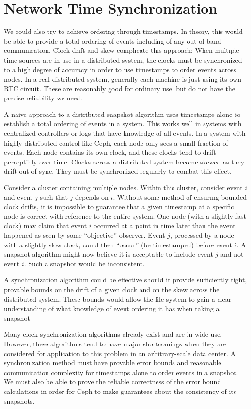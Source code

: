 \section{Network Time Synchronization}

We could also try to achieve ordering through timestamps. In theory,
this would be able to provide a total ordering of events including
of any out-of-band communication. Clock drift and skew complicate this
approach: When multiple time sources are in use in a distributed system,
the clocks must be synchronized to a high degree of accuracy in order
to use timestamps to order events across nodes. In a real distributed
system, generally each machine is just using its own RTC
circuit. These are reasonably good for ordinary use, but do not have
the precise reliability we need. %

A naive approach to a distributed snapshot algorithm uses timestamps
alone to establish a total ordering of events in a system. This works
well in systems with centralized controllers or logs that have
knowledge of all events. In a system with highly distributed control
like Ceph, each node only sees a small fraction of events. Each node
contains its own clock, and these clocks tend to drift perceptibly
over time. Clocks across a distributed system become skewed as they
drift out of sync. They must be synchronized regularly to combat this
effect.

Consider a cluster containing multiple nodes. Within this cluster,
consider event $i$ and event $j$ such that $j$ depends on $i$. Without
some method of ensuring bounded clock drifts, it is impossible to
guarantee that a given timestamp at a specific node is correct with
reference to the entire system. One node (with a slightly fast clock)
may claim that event $i$ occurred at a point in time later than the
event happened as seen by some ``objective'' observer. Event $j$,
processed by a node with a slightly slow clock, could then ``occur''
(be timestamped) before event $i$. A snapshot algorithm might now
believe it is acceptable to include event $j$ and not event $i$. Such
a snapshot would be inconsistent.

A synchronization algorithm could be effective should it provide
sufficiently tight, provable bounds on the drift of a given clock and
on the skew across the distributed system. These bounds would allow
the file system to gain a clear understanding of what knowledge of
event ordering it has when taking a snapshot.

Many clock synchronization algorithms already exist and are in wide
use. However, these algorithms tend to have major shortcomings when
they are considered for application to this problem in an
arbitrary-scale data center. A synchronization method must have
provable error bounds and reasonable communication complexity for
timestamps alone to order events in a snapshot. We must also be able
to prove the reliable correctness of the error bound calculations in
order for Ceph to make guarantees about the consistency of its
snapshots.

